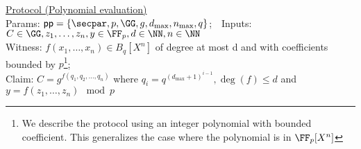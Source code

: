 \documentclass{article}
\theoremstyle{definition}
\begin{document}
\begin{small}
 \begin{minipage}{1.1\textwidth}
\begin{mdframed}[userdefinedwidth=1\textwidth]  \label{prot:Opening}
	\noindent \underline{\textsf{Protocol \eval} (Polynomial evaluation)}\\
\noindent Params: $\crs=\{\secpar,p,\GG,g,d_{\max},n_{\max},q\}$;\ \
Inputs: $C\in \GG,z_1,\dots,z_n,y\in \FF_p,d \in \NN,n \in \NN $\\
Witness: $f(x_1,\dots,x_n) \in B_q[X^n]$ of degree at most d and with coefficients bounded by $p$\footnote{We describe the protocol using an integer polynomial with bounded coefficient. This generalizes the case where the polynomial is in $\FF_p[X^n]$};\\ 
Claim: $C=g^{f(q_1,q_2,\dots,q_n)}$ where $q_i=q^{(d_{\max}+1)^{i-1} },\deg(f)\leq d$ and $y=f(z_1,\dots,z_n) \mod p$


\end{mdframed}
\end{minipage}
\end{small}
\end{document}
